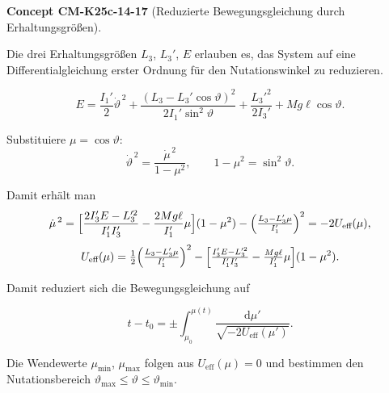 \documentclass[10pt, letterpaper]{article}
\newcommand{\CustomHeading}[3]{%
  \par\medskip\noindent%
  \textbf{#1 #2} \textnormal{(#3)}.\enskip%
}
\newenvironment{CONC}[2]{\CustomHeading{Concept}{#1}{#2}}{}
\begin{document}
\begin{CONC}{CM-K25c-14-17}{Reduzierte Bewegungsgleichung durch Erhaltungsgrößen}
Die drei Erhaltungsgrößen $L_3$, $L_3'$, $E$ erlauben es, das System auf eine Differentialgleichung erster Ordnung für den Nutationswinkel zu reduzieren.  

\[
E=\frac{I_1'}{2}\dot{\vartheta}^{\,2}
   +\frac{(L_3-L_3'\cos\vartheta)^{2}}{2I_1'\sin^{2}\vartheta}
   +\frac{L_3'^{2}}{2I_3'}+Mg\ell\cos\vartheta .
\]

Substituiere $\mu=\cos\vartheta$:
\[
\dot{\vartheta}^{\,2}
  =\frac{\dot{\mu}^{\,2}}{1-\mu^{2}},\qquad
1-\mu^{2}=\sin^{2}\vartheta .
\]

Damit erhält man
\[
\dot{\mu}^{\,2}
 =\Bigl[\frac{2I_3'E-L_3'^{2}}{I_1'I_3'}-\frac{2Mg\ell}{I_1'}\mu\Bigr](1-\mu^{2})
   -\Bigl(\tfrac{L_3-L_3'\mu}{I_1'}\Bigr)^{2}
 =-2U_{\text{eff}}(\mu),
\]
\[
U_{\text{eff}}(\mu)
  =\tfrac12\Bigl(\tfrac{L_3-L_3'\mu}{I_1'}\Bigr)^{2}
   -\Bigl[\tfrac{I_3'E-L_3'^{2}}{I_1'I_3'}
          -\tfrac{Mg\ell}{I_1'}\mu\Bigr](1-\mu^{2}).
\]

Damit reduziert sich die Bewegungsgleichung auf

\[
t-t_0
  =\pm\!\int_{\mu_0}^{\mu(t)}
       \frac{\mathrm d\mu'}
            {\sqrt{-2U_{\text{eff}}(\mu')}} .
\]

Die Wendewerte $\mu_{\min}$, $\mu_{\max}$ folgen aus $U_{\text{eff}}(\mu)=0$ und bestimmen den Nutationsbereich $\vartheta_{\max}\le\vartheta\le\vartheta_{\min}$.
\end{CONC}
\end{document}
